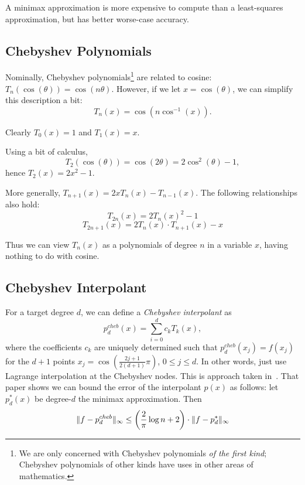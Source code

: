 \documentclass[../fheimpl.tex]{subfiles}
\begin{document}
    A minimax approximation is more expensive to compute than a least-squares approximation, but has better worse-case accuracy.	
    
    
    \subsection{Chebyshev Polynomials}
    Nominally, Chebyshev polynomials\footnote{We are only concerned with Chebyshev polynomials \emph{of the first kind}; Chebyshev polynomials of other kinds have uses in other areas of mathematics.} are related to cosine: $T_n(\cos(\theta)) = \cos(n\theta)$. However, if we let $x = \cos(\theta)$, we can simplify this description a bit:
    \[T_n(x) = \cos(n\cos^{-1}(x)).\]
    
    Clearly $T_0(x) = 1$ and $T_1(x) = x$.
    
    Using a bit of calculus,
    \[T_2(\cos(\theta)) = \cos(2\theta) = 2\cos^2(\theta) - 1,\] 
    hence $T_2(x) = 2x^2-1$.
    
    More generally, $T_{n+1}(x) = 2xT_n(x) - T_{n-1}(x)$. The following relationships also hold\cite[\S4.1]{cryptoeprint:2018/1043}:
    \begin{equation}
        \label{eqn:chebyeven}
        T_{2n}(x) = 2T_n(x)^2-1
    \end{equation}
    \begin{equation}
        \label{eqn:chebyodd}
        T_{2n+1}(x) = 2T_n(x)\cdot T_{n+1}(x)-x
    \end{equation}
    
    Thus we can view $T_n(x)$ as a polynomials of degree $n$ in a variable $x$, having nothing to do with cosine.
    
    
    \subsection{Chebyshev Interpolant}
    For a target degree $d$, we can define a \emph{Chebyshev interpolant} as
    \[p^{cheb}_d(x) = \sum_{i=0}^d c_kT_k(x),\]
    where the coefficients $c_k$ are uniquely determined such that $p^{cheb}_d(x_j) = f(x_j)$ for the $d+1$ points $x_j=\cos\left(\frac{2j+1}{2(d+1)}\pi\right)$, $0\le j \le d$. In other words, just use Lagrange interpolation at the Chebyshev nodes. This is approach taken in~\cite{cryptoeprint:2018/1043}. That paper shows we can bound the error of the interpolant $p(x)$ as follows: let $p^*_d(x)$ be degree-$d$ the minimax approximation. Then
    \[\lVert f-p_d^{cheb}\rVert_\infty \le \left(\frac{2}{\pi}\log{n}+2\right)\cdot \lVert f-p^*_d\rVert_\infty\]
    
\end{document}

